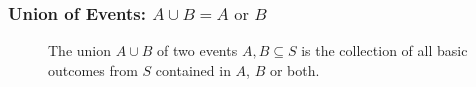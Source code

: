 \documentclass[handout]{beamer}
\begin{document}
\begin{frame}
\frametitle{Union of Events: $A\cup B = A \mbox{ or } B$}
\begin{figure}
\centering
{}
\caption{The union $A\cup B$ of two events $A,B\subseteq S$ is the collection of all basic outcomes from $S$ contained in $A$, $B$ or both.}
\end{figure}
\end{frame}
\end{document}
